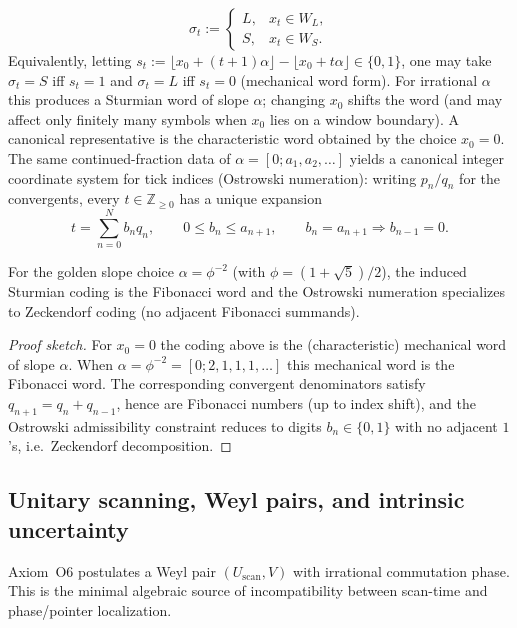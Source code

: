 \begin{equation}
    \sigma_t :=
    \begin{cases}
        L, & x_t\in W_L,\\
        S, & x_t\in W_S.
    \end{cases}
\end{equation}
Equivalently, letting $s_t:=\lfloor x_0+(t+1)\alpha\rfloor-\lfloor x_0+t\alpha\rfloor\in\{0,1\}$, one may take $\sigma_t=S$ iff $s_t=1$ and $\sigma_t=L$ iff $s_t=0$ (mechanical word form).
For irrational $\alpha$ this produces a Sturmian word of slope $\alpha$; changing $x_0$ shifts the word (and may affect only finitely many symbols when $x_0$ lies on a window boundary). A canonical representative is the characteristic word obtained by the choice $x_0=0$. The same continued-fraction data of $\alpha=[0;a_1,a_2,\dots]$ yields a canonical integer coordinate system for tick indices (Ostrowski numeration): writing $p_n/q_n$ for the convergents, every $t\in\mathbb{Z}_{\ge 0}$ has a unique expansion
\begin{equation}
    t=\sum_{n=0}^{N} b_n q_n,\qquad 0\le b_n\le a_{n+1},\qquad b_n=a_{n+1}\Rightarrow b_{n-1}=0.
\end{equation}

\begin{proposition}
For the golden slope choice $\alpha=\phi^{-2}$ (with $\phi=(1+\sqrt{5})/2$), the induced Sturmian coding is the Fibonacci word and the Ostrowski numeration specializes to Zeckendorf coding (no adjacent Fibonacci summands).
\end{proposition}
\begin{proof}[Proof sketch]
For $x_0=0$ the coding above is the (characteristic) mechanical word of slope $\alpha$. When $\alpha=\phi^{-2}=[0;2,1,1,1,\dots]$ this mechanical word is the Fibonacci word. The corresponding convergent denominators satisfy $q_{n+1}=q_n+q_{n-1}$, hence are Fibonacci numbers (up to index shift), and the Ostrowski admissibility constraint reduces to digits $b_n\in\{0,1\}$ with no adjacent $1$'s, i.e.\ Zeckendorf decomposition.
\end{proof}

\subsection{Unitary scanning, Weyl pairs, and intrinsic uncertainty}
Axiom~O6 postulates a Weyl pair $(U_{\mathrm{scan}},V)$ with irrational commutation phase. This is the minimal algebraic source of incompatibility between scan-time and phase/pointer localization.

